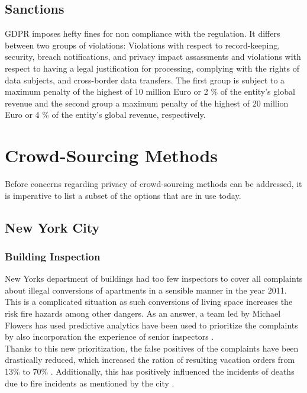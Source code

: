 \documentclass[a4paper,12pt]{report}
\begin{document}
	\closesection

	\section{Sanctions}
	\startsection
	GDPR imposes hefty fines for non compliance with the regulation.
	It differs between two groups of violations: Violations with respect to record-keeping, security, breach notifications, and privacy impact assassments and violations with respect to having a legal justification for processing, complying with the rights of data subjects, and cross-border data transfers.
	The first group is subject to a maximum penalty of the highest of 10 million Euro or 2 \% of the entity's global revenue and the second group a maximum penalty of the highest of 20 million Euro or 4 \% of the entity's global revenue, respectively.
	\closesection
	
	
	\chapter{Crowd-Sourcing Methods}
	Before concerns regarding privacy of crowd-sourcing methods can be addressed, it is imperative to list a subset of the options that are in use today.

	\section{New York City}
	\startsection
		\subsection{Building Inspection}
		\startsubsection
			New Yorks department of buildings had too few inspectors to cover all complaints about illegal conversions of apartments in a sensible manner in the year 2011. This is a complicated situation as such conversions of living space increases the risk fire hazards among other dangers. As an answer, a team led by Michael Flowers has used predictive analytics have been used to prioritize the complaints by also incorporation the experience of senior inspectors \cite{BeyondOpenData}.\\
			Thanks to this new prioritization, the false positives of the complaints have been drastically reduced, which increased the ration of resulting vacation orders from 13\% to 70\% \cite{PredictiveDataAnalytics}.
			Additionally, this has positively influenced the incidents of deaths due to fire incidents as mentioned by the city \cite{BigDataBigApple} \cite{FDNY}.
		\closesection
\end{document}

